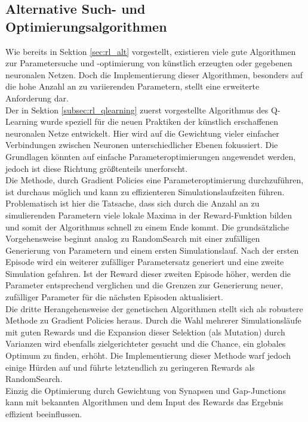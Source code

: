 	\subsection{Alternative Such- und Optimierungsalgorithmen}
		Wie bereits in Sektion \ref{sec:rl_alt} vorgestellt, existieren  viele gute Algorithmen zur Parametersuche und -optimierung von künstlich erzeugten oder gegebenen neuronalen Netzen. Doch die Implementierung dieser Algorithmen, besonders auf die hohe Anzahl an zu variierenden Parametern, stellt eine erweiterte Anforderung dar.\\
		Der in Sektion \ref{subsec:rl_qlearning} zuerst vorgestellte Algorithmus des Q-Learning wurde speziell für die neuen Praktiken der künstlich erschaffenen neuronalen Netze entwickelt. Hier wird auf die Gewichtung vieler einfacher Verbindungen zwischen Neuronen unterschiedlicher Ebenen fokussiert. Die Grundlagen könnten auf einfache Parameteroptimierungen angewendet werden, jedoch ist diese Richtung größtenteils unerforscht.\\
		Die Methode, durch Gradient Policies eine Parameteroptimierung durchzuführen, ist durchaus möglich und kann zu effizienteren Simulationslaufzeiten führen. Problematisch ist hier die Tatsache, dass sich durch die Anzahl an zu simulierenden Parametern viele lokale Maxima in der Reward-Funktion bilden und somit der Algorithmus schnell zu einem Ende kommt. Die grundsätzliche Vorgehensweise beginnt analog zu RandomSearch mit einer zufälligen Generierung von Parametern und einem ersten Simulationslauf. Nach der ersten Episode wird ein weiterer zufälliger Parametersatz generiert und eine zweite Simulation gefahren. Ist der Reward dieser zweiten Episode höher, werden die Parameter entsprechend verglichen und die Grenzen zur Generierung neuer, zufälliger Parameter für die nächsten Episoden aktualisiert.\\
		Die dritte Herangehensweise der genetischen Algorithmen stellt sich als robustere Methode zu Gradient Policies heraus. Durch die Wahl mehrerer Simulationsläufe mit guten Rewards und die Expansion dieser Selektion (als Mutation) durch Varianzen wird ebenfalls zielgerichteter gesucht und die Chance, ein globales Optimum zu finden, erhöht. Die Implementierung dieser Methode warf jedoch einige Hürden auf und führte letztendlich zu geringeren Rewards als RandomSearch.\\
		Einzig die Optimierung durch Gewichtung von Synapsen und Gap-Junctions kann mit bekannten Algorithmen und dem Input des Rewards das Ergebnis effizient beeinflussen.


